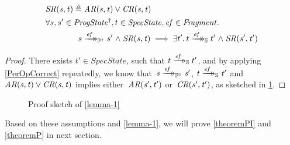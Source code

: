 \begin{lemma}\label{lemma-1}
	\begin{align*}
		&\mathit{SR(s, t)} {}\triangleq{} \mathit{AR(s, t)} \lor \mathit{CR(s, t)}\\
		&\forall s, s' \in \mathit{ProgState^\dagger}, t \in \mathit{SpecState}, \mathit{ef} \in \mathit{Fragment} \ldotp\\
		&\qquad \qquad s \xrightarrow{\mathit{ef}}\mathrel{\mkern-14mu}\rightarrow_{\mathbb P^\dagger} s'  \mathrel\land \mathit{SR(s, t)} \implies \exists t' \ldotp t \xrightarrow{\mathit{ef}}\mathrel{\mkern-14mu}\rightarrow_{\mathbb S} t' \mathrel\land \mathit{SR(s', t')} \\
	\end{align*}
\end{lemma}
	\begin{onehalfspacing}
\begin{proof}
	There exists $t' \in SpecState$, such that $t \xrightarrow{\mathit{ef}}\mathrel{\mkern-14mu}\rightarrow_{\mathbb S} t'$, and by applying \cref{PerOpCorrect} repeatedly, we know that~$\mathit{s \xrightarrow{\mathit{ef}}\mathrel{\mkern-14mu}\rightarrow_{\mathbb P^\dagger} s'}$, $\mathit{t \xrightarrow{\mathit{ef}}\mathrel{\mkern-14mu}\rightarrow_{\mathbb S} t'}$ and~$\mathit{AR(s, t)} \lor \mathit{CR(s, t)}$ implies either~$\mathit{AR(s', t')}$ or~$\mathit{CR(s', t')}$, as sketched in \cref{fig:sketch1}.
\end{proof}
	\end{onehalfspacing}
	\begin{figure}[h] \centering
{}
		\caption{Proof sketch of \cref{lemma-1}}
\label{fig:sketch1}
	\end{figure}
Based on these assumptions and \cref{lemma-1}, we will prove \cref{theoremPI} and \cref{theoremP} in next section.